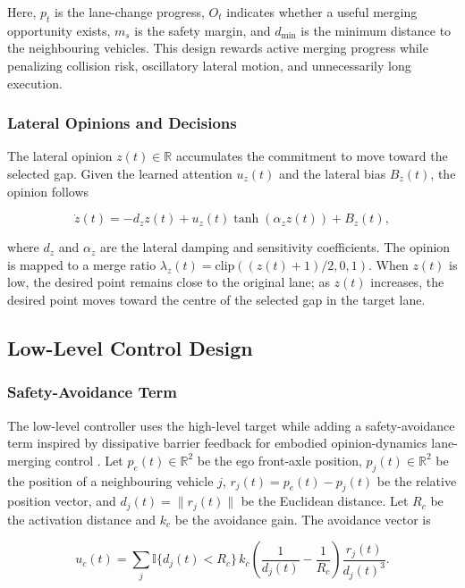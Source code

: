 Here, \(p_t\) is the lane-change progress, \(O_t\) indicates whether a useful merging opportunity exists, \(m_s\) is the safety margin, and \(d_{\min}\) is the minimum distance to the neighbouring vehicles. This design rewards active merging progress while penalizing collision risk, oscillatory lateral motion, and unnecessarily long execution.

\subsubsection{Lateral Opinions and Decisions}

The lateral opinion \(z(t)\in\mathbb{R}\) accumulates the commitment to move toward the selected gap. Given the learned attention \(u_z(t)\) and the lateral bias \(B_z(t)\), the opinion follows

{\small
\begin{equation}
\dot{z}(t)=-d_z z(t)+u_z(t)\tanh\!\left(\alpha_z z(t)\right)+B_z(t),
\end{equation}
}

where \(d_z\) and \(\alpha_z\) are the lateral damping and sensitivity coefficients. The opinion is mapped to a merge ratio \(\lambda_z(t)=\mathrm{clip}((z(t)+1)/2,0,1)\). When \(z(t)\) is low, the desired point remains close to the original lane; as \(z(t)\) increases, the desired point moves toward the centre of the selected gap in the target lane.

\subsection{Low-Level Control Design}

\subsubsection{Safety-Avoidance Term}

The low-level controller uses the high-level target while adding a safety-avoidance term inspired by dissipative barrier feedback for embodied opinion-dynamics lane-merging control \cite{R17}. Let \(p_e(t)\in\mathbb{R}^2\) be the ego front-axle position, \(p_j(t)\in\mathbb{R}^2\) be the position of a neighbouring vehicle \(j\), \(r_j(t)=p_e(t)-p_j(t)\) be the relative position vector, and \(d_j(t)=\|r_j(t)\|\) be the Euclidean distance. Let \(R_c\) be the activation distance and \(k_c\) be the avoidance gain. The avoidance vector is

{\small
\begin{equation}
u_c(t)=\sum_j
\mathbb{I}\{d_j(t)<R_c\}\,
k_c\left(\frac{1}{d_j(t)}-\frac{1}{R_c}\right)
\frac{r_j(t)}{d_j(t)^3}.
\end{equation}
}


